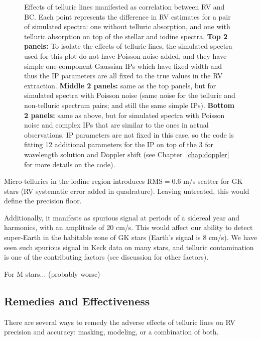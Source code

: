 \begin{figure}
\caption{Effects of telluric lines manifested as correlation between
  RV and BC. Each point represents the difference in RV estimates for
  a pair of simulated spectra: one without telluric absorption, and
  one with telluric absorption on top of the stellar and iodine
  spectra. {\bf Top 2 panels:} To isolate the effects of telluric
  lines, the simulated spectra used for this plot do not have Poisson
  noise added, and they have simple one-component Gaussian IPs which
  have fixed width and thus the IP parameters are all fixed to the
  true values in the RV extraction. {\bf Middle 2 panels:} same as the
  top panels, but for simulated spectra with Poisson noise (same noise
  for the telluric and non-telluric spectrum pairs; and still the same
  simple IPs). {\bf Bottom 2 panels:} same as above, but for simulated
  spectra with Poisson noise and complex IPs that are similar to the
  ones in actual observations. IP parameters are not fixed in this
  case, so the code is fitting 12 additional parameters for the IP on
  top of the 3 for wavelength solution and Doppler shift (see
  Chapter~\ref{chap:doppler} for more details on the code).
\label{telluric:fig:sim}}
\end{figure}


Micro-tellurics in the iodine region introduces RMS$=0.6$ m/s scatter
for GK stars (RV systematic error added in quadrature). Leaving
untreated, this would define the precision floor.

Additionally, it manifests as spurious signal at periods of a sidereal
year and harmonics, with an amplitude of 20 cm/s. This would affect
our ability to detect super-Earth in the habitable zone of GK stars
(Earth's signal is 8 cm/s). We have seen such spurious signal in Keck
data on many stars, and telluric contamination is one of the
contributing factors (see discussion for other factors).

For M stars... (probably worse)


\subsection{Remedies and Effectiveness}

There are several ways to remedy the adverse effects of telluric lines
on RV precision and accuracy: masking, modeling, or a combination of both.

